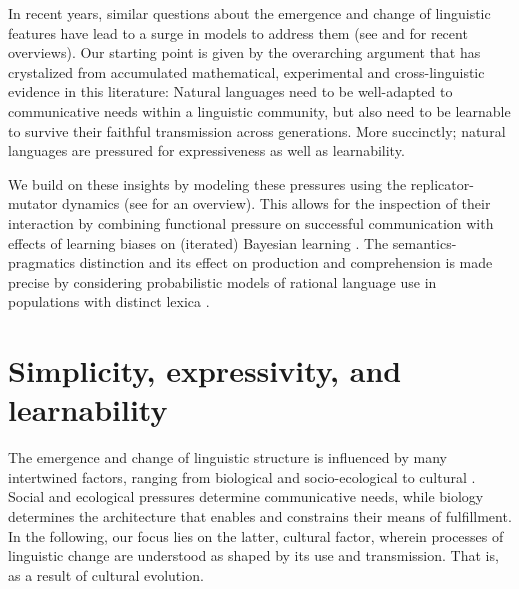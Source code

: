 \documentclass[a4paper]{article}
\begin{document}
In recent years, similar questions about the emergence and change of linguistic features have lead to a surge in models to address them (see \citealt{steels:2015} and \citealt{tamariz+kirby:2016} for recent overviews). Our starting point is given by the overarching argument that has crystalized from accumulated mathematical, experimental and cross-linguistic evidence in this literature: Natural languages need to be well-adapted to communicative needs within a linguistic community, but also need to be learnable to survive their faithful transmission across generations. More succinctly; natural languages are pressured for expressiveness as well as learnability.   

We build on these insights by modeling these pressures using the replicator-mutator dynamics (see \citealt{hofbauer+sigmund:2003} for an overview). This allows for the inspection of their interaction by combining functional pressure on successful communication with effects of learning biases on (iterated) Bayesian learning \citep{griffiths+kalish:2007}. The semantics-pragmatics distinction and its effect on production and comprehension is made precise by considering probabilistic models of rational language use in populations with distinct lexica \citep{frank+goodman:2012,franke+jaeger:2014, bergen+etal:2016}. 




\section{Simplicity, expressivity, and learnability}

The emergence and change of linguistic structure is influenced by many intertwined factors, ranging from biological and socio-ecological to cultural \citep{steels:2011,tamariz+kirby:2016}. Social and ecological pressures determine communicative needs, while biology determines the architecture that enables and constrains their means of fulfillment. In the following, our focus lies on the latter, cultural factor, wherein processes of linguistic change are understood as shaped by its use and transmission. That is, as a result of cultural evolution.
\end{document}
